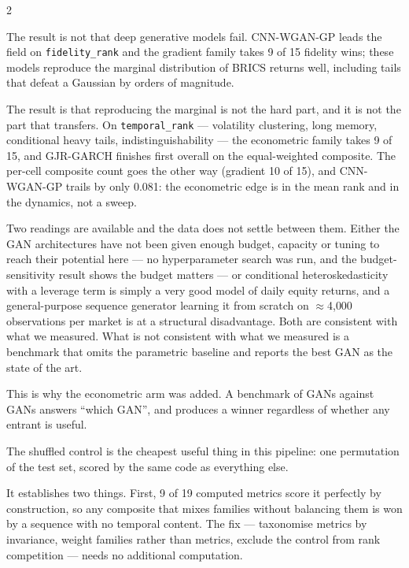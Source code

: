 \documentclass[10pt]{article}
\newcommand{\navybox}[2]{\begin{tcolorbox}[mybox={Navy}{LBg},title={#1}]#2\end{tcolorbox}}
\newcommand{\skybox}[2]{\begin{tcolorbox}[mybox={Sky}{BBg},title={#1}]#2\end{tcolorbox}}
\begin{document}
\begin{multicols}{2}

\navybox{A 6-Parameter Model Wins, and Why That Is the Interesting Part}{%
The result is not that deep generative models fail. CNN-WGAN-GP leads the field on \texttt{fidelity\_rank} and the gradient family takes 9 of 15 fidelity wins; these models reproduce the marginal distribution of BRICS returns well, including tails that defeat a Gaussian by orders of magnitude.

The result is that reproducing the marginal is not the hard part, and it is not the part that transfers. On \texttt{temporal\_rank} --- volatility clustering, long memory, conditional heavy tails, indistinguishability --- the econometric family takes 9 of 15, and GJR-GARCH finishes first overall on the equal-weighted composite. The per-cell composite count goes the other way (gradient 10 of 15), and CNN-WGAN-GP trails by only 0.081: the econometric edge is in the mean rank and in the dynamics, not a sweep.

Two readings are available and the data does not settle between them. Either the GAN architectures have not been given enough budget, capacity or tuning to reach their potential here --- no hyperparameter search was run, and the budget-sensitivity result shows the budget matters --- or conditional heteroskedasticity with a leverage term is simply a very good model of daily equity returns, and a general-purpose sequence generator learning it from scratch on $\approx$4{,}000 observations per market is at a structural disadvantage. Both are consistent with what we measured. What is not consistent with what we measured is a benchmark that omits the parametric baseline and reports the best GAN as the state of the art.

\smallskip
This is why the econometric arm was added. A benchmark of GANs against GANs answers ``which GAN'', and produces a winner regardless of whether any entrant is useful.}

\skybox{The Audit as a Methodological Contribution}{%
The shuffled control is the cheapest useful thing in this pipeline: one permutation of the test set, scored by the same code as everything else.

It establishes two things. First, 9 of 19 computed metrics score it perfectly by construction, so any composite that mixes families without balancing them is won by a sequence with no temporal content. The fix --- taxonomise metrics by invariance, weight families rather than metrics, exclude the control from rank competition --- needs no additional computation.

}
\end{multicols}
\end{document}

